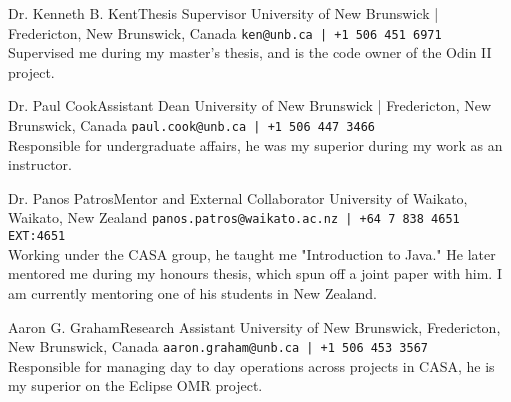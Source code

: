 \documentclass{developercv} %
\begin{document}
\begin{entrylist}

	\entry%
	{Dr. Kenneth B. Kent}{Thesis Supervisor}
	{University of New Brunswick | Fredericton, New Brunswick, Canada}
	{\texttt{ken@unb.ca | +1 506 451 6971}\\
		Supervised me during my master's thesis, and is the code owner of the Odin II project.
	}

	\entry%
	{Dr. Paul Cook}{Assistant Dean}
	{University of New Brunswick | Fredericton, New Brunswick, Canada}
	{\texttt{paul.cook@unb.ca | +1 506 447 3466}\\
		Responsible for undergraduate affairs, he was my superior during my work as an instructor.
	}

	\entry%
	{Dr. Panos Patros}{Mentor and External Collaborator}
	{University of Waikato, Waikato, New Zealand}
	{\texttt{panos.patros@waikato.ac.nz | +64 7 838 4651 EXT:4651}\\
		Working under the CASA group, he taught me "Introduction to Java."
		He later mentored me during my honours thesis, which spun off a joint paper with him.
		I am currently mentoring one of his students in New Zealand.
	}

	\entry%
	{Aaron G. Graham}{Research Assistant}
	{University of New Brunswick, Fredericton, New Brunswick, Canada}
	{\texttt{aaron.graham@unb.ca | +1 506 453 3567}\\
		Responsible for managing day to day operations across projects in CASA, he is my superior on the Eclipse OMR project.
	}

\end{entrylist}
\end{document}
